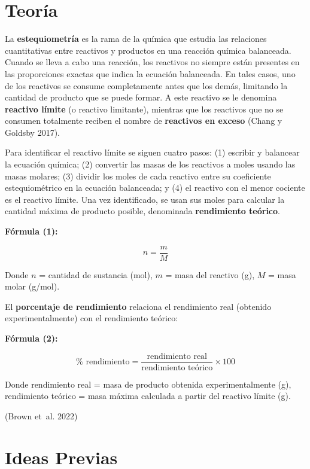 \documentclass[
  spanish,
  letterpaper,
  12pt,
  oneside,
  open=any]{scrbook}
\newcommand{\setcolorsection}[2]{%
  \definecolor{currentsectionbg}{HTML}{#1}%
  \definecolor{currentsectionborder}{HTML}{#2}%
}
\begin{document}
\setcolorsection{e8e8e8}{d0d0d0}

\section{Teoría}\label{teoruxeda}

La \textbf{estequiometría} es la rama de la química que estudia las
relaciones cuantitativas entre reactivos y productos en una reacción
química balanceada. Cuando se lleva a cabo una reacción, los reactivos
no siempre están presentes en las proporciones exactas que indica la
ecuación balanceada. En tales casos, uno de los reactivos se consume
completamente antes que los demás, limitando la cantidad de producto que
se puede formar. A este reactivo se le denomina \textbf{reactivo límite}
(o reactivo limitante), mientras que los reactivos que no se consumen
totalmente reciben el nombre de \textbf{reactivos en exceso} (Chang y
Goldsby 2017).

Para identificar el reactivo límite se siguen cuatro pasos: (1) escribir
y balancear la ecuación química; (2) convertir las masas de los
reactivos a moles usando las masas molares; (3) dividir los moles de
cada reactivo entre su coeficiente estequiométrico en la ecuación
balanceada; y (4) el reactivo con el menor cociente es el reactivo
límite. Una vez identificado, se usan sus moles para calcular la
cantidad máxima de producto posible, denominada \textbf{rendimiento
teórico}.

\textbf{Fórmula (1):}

\[ n = \frac{m}{M} \tag{1} \]

Donde \(n\) = cantidad de sustancia (mol), \(m\) = masa del reactivo
(g), \(M\) = masa molar (g/mol).

El \textbf{porcentaje de rendimiento} relaciona el rendimiento real
(obtenido experimentalmente) con el rendimiento teórico:

\textbf{Fórmula (2):}

\[ \% \text{ rendimiento} = \frac{\text{rendimiento real}}{\text{rendimiento teórico}} \times 100 \tag{2} \]

Donde rendimiento real = masa de producto obtenida experimentalmente
(g), rendimiento teórico = masa máxima calculada a partir del reactivo
límite (g).

(Brown et~al. 2022)

\setcolorsection{f9ebaf}{e8d68a}

\section{Ideas Previas}\label{ideas-previas}
\end{document}
